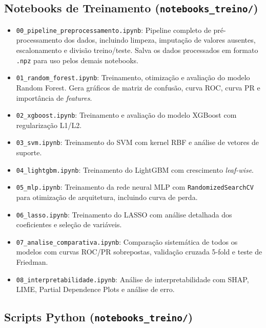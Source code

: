 \documentclass[12pt, a4paper, oneside]{report}
\begin{document}
\subsection{Notebooks de Treinamento (\texttt{notebooks\_treino/})}

\begin{itemize}
    \item \texttt{00\_pipeline\_preprocessamento.ipynb}: Pipeline completo de pré-processamento dos dados, incluindo limpeza, imputação de valores ausentes, escalonamento e divisão treino/teste. Salva os dados processados em formato \texttt{.npz} para uso pelos demais notebooks.
    \item \texttt{01\_random\_forest.ipynb}: Treinamento, otimização e avaliação do modelo Random Forest. Gera gráficos de matriz de confusão, curva ROC, curva PR e importância de \textit{features}.
    \item \texttt{02\_xgboost.ipynb}: Treinamento e avaliação do modelo XGBoost com regularização L1/L2.
    \item \texttt{03\_svm.ipynb}: Treinamento do SVM com kernel RBF e análise de vetores de suporte.
    \item \texttt{04\_lightgbm.ipynb}: Treinamento do LightGBM com crescimento \textit{leaf-wise}.
    \item \texttt{05\_mlp.ipynb}: Treinamento da rede neural MLP com \texttt{RandomizedSearchCV} para otimização de arquitetura, incluindo curva de perda.
    \item \texttt{06\_lasso.ipynb}: Treinamento do LASSO com análise detalhada dos coeficientes e seleção de variáveis.
    \item \texttt{07\_analise\_comparativa.ipynb}: Comparação sistemática de todos os modelos com curvas ROC/PR sobrepostas, validação cruzada 5-fold e teste de Friedman.
    \item \texttt{08\_interpretabilidade.ipynb}: Análise de interpretabilidade com SHAP, LIME, Partial Dependence Plots e análise de erro.
\end{itemize}

\subsection{Scripts Python (\texttt{notebooks\_treino/})}
\end{document}
